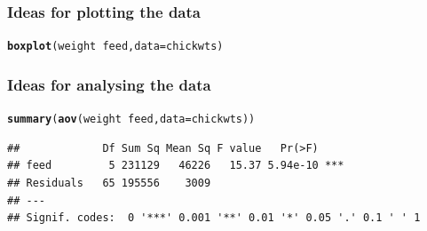 \documentclass{beamer}\usepackage[]{graphicx}\usepackage[]{color}
\makeatletter
\newcommand{\hlopt}[1]{\textcolor[rgb]{0,0,0}{#1}}%
\newcommand{\hlstd}[1]{\textcolor[rgb]{0.345,0.345,0.345}{#1}}%
\newcommand{\hlkwc}[1]{\textcolor[rgb]{0.333,0.667,0.333}{#1}}%
\newcommand{\hlkwd}[1]{\textcolor[rgb]{0.737,0.353,0.396}{\textbf{#1}}}%
\newenvironment{kframe}{%
 \def\at@end@of@kframe{}%
 \ifinner\ifhmode%
  \def\at@end@of@kframe{\end{minipage}}%
  \begin{minipage}{\columnwidth}%
 \fi\fi%
 \def\FrameCommand##1{\hskip\@totalleftmargin \hskip-\fboxsep
 \colorbox{shadecolor}{##1}\hskip-\fboxsep
     \hskip-\linewidth \hskip-\@totalleftmargin \hskip\columnwidth}%
 \MakeFramed {\advance\hsize-\width
   \@totalleftmargin\z@ \linewidth\hsize
   \@setminipage}}%
 {\par\unskip\endMakeFramed%
 \at@end@of@kframe}
\newenvironment{knitrout}{}{} %
\makeatother
\begin{document}
\begin{frame}[fragile]
\frametitle{Ideas for plotting the data}
\pause
\begin{knitrout}\scriptsize
{}\color{fgcolor}\begin{kframe}
\begin{alltt}
\hlkwd{boxplot}\hlstd{(weight} \hlopt{~} \hlstd{feed,} \hlkwc{data} \hlstd{= chickwts)}
\end{alltt}
\end{kframe}
\end{knitrout}
\end{frame}


\begin{frame}[fragile]
\frametitle{Ideas for analysing the data}
\pause
\begin{knitrout}\scriptsize
{}\color{fgcolor}\begin{kframe}
\begin{alltt}
\hlkwd{summary}\hlstd{(}\hlkwd{aov}\hlstd{(weight} \hlopt{~} \hlstd{feed,} \hlkwc{data} \hlstd{= chickwts))}
\end{alltt}
\begin{verbatim}
##             Df Sum Sq Mean Sq F value   Pr(>F)    
## feed         5 231129   46226   15.37 5.94e-10 ***
## Residuals   65 195556    3009                     
## ---
## Signif. codes:  0 '***' 0.001 '**' 0.01 '*' 0.05 '.' 0.1 ' ' 1
\end{verbatim}
\end{kframe}
\end{knitrout}
\end{frame}

\end{document}

